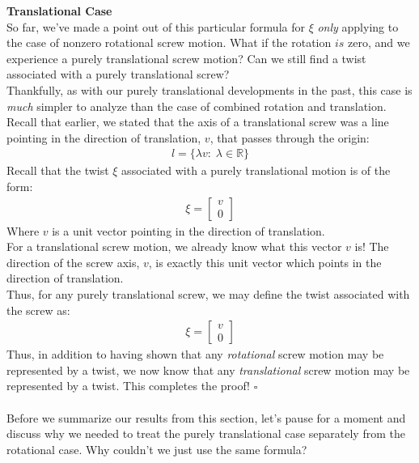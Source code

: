 \documentclass[oneside]{book}
\begin{document}
\textbf{Translational Case}\\
So far, we've made a point out of this particular formula for $\xi$ \textit{only} applying to the case of nonzero rotational screw motion. What if the rotation $is$ zero, and we experience a purely translational screw motion? Can we still find a twist associated with a purely translational screw?\\
Thankfully, as with our purely translational developments in the past, this case is \textit{much} simpler to analyze than the case of combined rotation and translation.\\
Recall that earlier, we stated that the axis of a translational screw was a line pointing in the direction of translation, $v$, that passes through the origin:
\begin{align}
    l = \{ \lambda v: \; \lambda \in \mathbb{R}\}
\end{align}
Recall that the twist $\xi$ associated with a purely translational motion is of the form:
\begin{align}
    \xi = \begin{bmatrix}
    v\\
    0
    \end{bmatrix}
\end{align}
Where $v$ is a unit vector pointing in the direction of translation.\\
For a translational screw motion, we already know what this vector $v$ is! The direction of the screw axis, $v$, is exactly this unit vector which points in the direction of translation.\\
Thus, for any purely translational screw, we may define the twist associated with the screw as:
\begin{align}
    \xi = \begin{bmatrix}
        v\\
        0
    \end{bmatrix}
\end{align}
Thus, in addition to having shown that any \textit{rotational} screw motion may be represented by a twist, we now know that any \textit{translational} screw motion may be represented by a twist. This completes the proof! $\square$\\\\
Before we summarize our results from this section, let's pause for a moment and discuss why we needed to treat the purely translational case separately from the rotational case. Why couldn't we just use the same formula?\\
\end{document}
